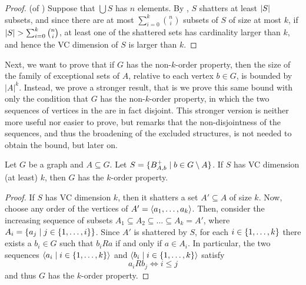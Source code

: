     \begin{proof} (of )
        Suppose that $\bigcup S$ has $n$ elements.
        By , $S$ shatters at least $| S |$ subsets, and since there are at most
        $\sum_{i=0}^k \binom{n}{i}$ subsets of $S$ of size at most $k$, if
        $| S | > \sum_{i=0}^k \binom{n}{i}$, at least one of the shattered sets has cardinality larger than $k$,
        and hence the VC dimension of $S$ is larger than $k$.
    \end{proof}

    Next, we want to prove that if $G$ has the non-$k$-order property, then the size of the family of exceptional
    sets of $A$, relative to each vertex $b \in G$, is bounded by $|A|^k$.
    Instead, we prove a stronger result, that is we prove this same bound with only the condition that $G$
    has the  non-$k$-order property, in which the two sequences of vertices in the 
    are in fact disjoint.
    This stronger version is neither more useful nor easier to prove, but remarks that the non-disjointness of the sequences,
    and thus the broadening of the excluded structures, is not needed to obtain the bound, but later on.

    \begin{lemma} \label{lem:vc_dimension_implies_k_order_property}
        Let $G$ be a graph and $A \subseteq G$.
        Let $S = \{ B^+_{A,b} \mid b \in G \setminus A \}$.
        If $S$ has VC dimension (at least) $k$, then $G$ has the $k$-order property.
        \begin{proof}
            If $S$ has VC dimension $k$, then it shatters a set $A' \subseteq A$ of size $k$.
            Now, choose any order of the vertices of $A' = \left< a_1, \dots, a_k \right>$.
            Then, consider the increasing sequence of subsets $A_1 \subseteq A_2 \subseteq \dots \subseteq A_k = A'$,
            where $A_i = \{ a_j \mid j \in \{ 1, \dots, i \} \}$.
            Since $A'$ is shattered by $S$, for each $i \in \{ 1, \dots, k \}$ there exists a $b_i \in G$ such that
            $b_i R a$ if and only if $a \in A_i$.
            In particular, the two sequences $\left< a_i \mid i \in \{ 1, \dots, k \} \right>$ and
            $\left< b_i \mid i \in \{ 1, \dots, k \} \right>$ satisfy
            \[
                a_i R b_j \Leftrightarrow i \leq j
            \]
            and thus $G$ has the $k$-order property.
        \end{proof}
    \end{lemma}


